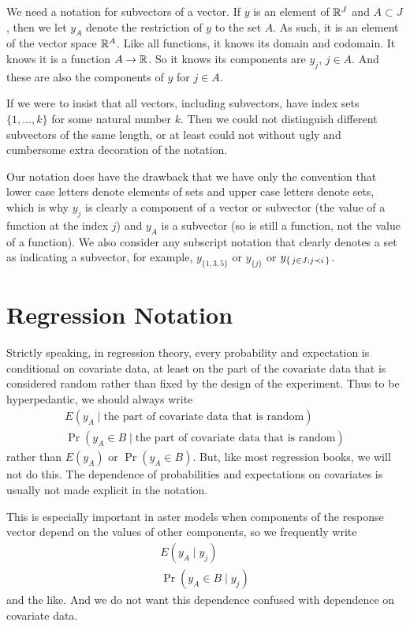 We need a notation for subvectors of a vector.  If $y$ is an element
of $\mathbb{R}^J$ and $A \subset J$, then we let $y_A$ denote the restriction
of $y$ to the set $A$.
As such, it is an element of the vector space $\mathbb{R}^A$.
Like all functions, it knows its domain and codomain.
It knows it is a function $A \to \mathbb{R}$.
So it knows its components are $y_j$, $j \in A$.
And these are also the components of $y$ for $j \in A$.

If we were to insist that all vectors, including subvectors, have
index sets $\{1, \ldots, k\}$ for some natural number $k$.  Then we could
not distinguish different subvectors of the same length, or at least could
not without ugly and cumbersome extra decoration of the notation.

Our notation does have the drawback that we have only the convention
that lower case letters denote elements of sets and upper case letters
denote sets, which is why $y_j$ is clearly a component of a vector or subvector
(the value of a function at the index $j$) and $y_A$ is a subvector
(so is still a function, not the value of a function).
We also consider any subscript notation that clearly denotes a set
as indicating a subvector, for example, $y_{\{1, 3, 5\}}$ or $y_{\{j\}}$ or
$y_{\{\,  j \in J : j \prec i  \,\}}$.

\section{Regression Notation}

Strictly speaking, in regression theory, every probability and expectation
is conditional on covariate data, at least on the part of the covariate data
that is considered random rather than fixed by the design of the experiment.
Thus to be hyperpedantic, we should always write
\begin{gather*}
   E(y_A \mid \text{the part of covariate data that is random})
   \\
   \Pr(y_A \in B \mid \text{the part of covariate data that is random})
\end{gather*}
rather than $E(y_A)$ or $\Pr(y_A \in B)$.  But, like most regression books,
we will not do this.  The dependence of probabilities and expectations on
covariates is usually not made explicit in the notation.

This is especially important in aster models when components of the response
vector depend on the values of other components, so we frequently write
\begin{gather*}
   E(y_A \mid y_j)
   \\
   \Pr(y_A \in B \mid y_j)
\end{gather*}
and the like.  And we do not want this dependence confused with dependence
on covariate data.

